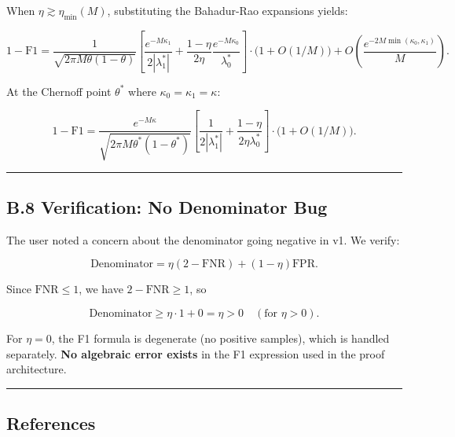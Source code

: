 \documentclass[
  12pt,
]{article}
\begin{document}
When \(\eta \gtrsim \eta_{\min}(M)\), substituting the Bahadur-Rao
expansions yields:

\[
1 - \text{F1} = \frac{1}{\sqrt{2\pi M\theta(1-\theta)}}
\left[\frac{e^{-M\kappa_1}}{2|\lambda_1^*|} + \frac{1-\eta}{2\eta}\frac{e^{-M\kappa_0}}{\lambda_0^*}\right]
\cdot \big(1 + O(1/M)\big) + O\!\left(\frac{e^{-2M\min(\kappa_0,\kappa_1)}}{M}\right).
\]

At the Chernoff point \(\theta^*\) where
\(\kappa_0 = \kappa_1 = \kappa\):

\[
1 - \text{F1} = \frac{e^{-M\kappa}}{\sqrt{2\pi M\theta^*(1-\theta^*)}}
\left[\frac{1}{2|\lambda_1^*|} + \frac{1-\eta}{2\eta\lambda_0^*}\right]
\cdot \big(1 + O(1/M)\big).
\]

\begin{center}\rule{0.5\linewidth}{0.5pt}\end{center}

\subsection{B.8 Verification: No Denominator
Bug}\label{b.8-verification-no-denominator-bug}

The user noted a concern about the denominator going negative in v1. We
verify:

\[\text{Denominator} = \eta(2-\text{FNR}) + (1-\eta)\text{FPR}.\]

Since \(\text{FNR} \leq 1\), we have \(2 - \text{FNR} \geq 1\), so

\[\text{Denominator} \geq \eta \cdot 1 + 0 = \eta > 0 \quad (\text{for } \eta > 0).\]

For \(\eta = 0\), the F1 formula is degenerate (no positive samples),
which is handled separately. \textbf{No algebraic error exists} in the
F1 expression used in the proof architecture.

\begin{center}\rule{0.5\linewidth}{0.5pt}\end{center}

\subsection{References}\label{references}
\end{document}
